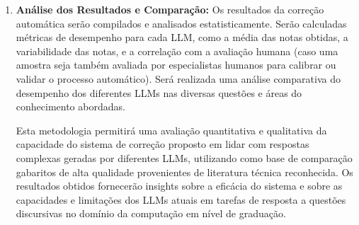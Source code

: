 \begin{enumerate}
\begin{itemize}
        \item \textbf{Coerência e Clareza:} Avaliação da organização lógica, fluidez textual e inteligibilidade da resposta gerada.

        \item \textbf{Similaridade Semântica:} Utilização de métricas de similaridade de texto (como cosseno de embeddings ou outras métricas específicas para avaliação de texto gerado por IA) para quantificar o quão próxima a resposta do LLM está do gabarito em termos de significado.
    \end{itemize}

    O sistema de correção automática, conforme descrito nas seções anteriores deste capítulo , atribuirá uma nota ou um conjunto de pontuações para cada resposta de cada LLM. 

    \item \textbf{Análise dos Resultados e Comparação:} Os resultados da correção automática serão compilados e analisados estatisticamente. Serão calculadas métricas de desempenho para cada LLM, como a média das notas obtidas, a variabilidade das notas, e a correlação com a avaliação humana (caso uma amostra seja também avaliada por especialistas humanos para calibrar ou validar o processo automático). Será realizada uma análise comparativa do desempenho dos diferentes LLMs nas diversas questões e áreas do conhecimento abordadas.

    Esta metodologia permitirá uma avaliação quantitativa e qualitativa da capacidade do sistema de correção proposto em lidar com respostas complexas geradas por diferentes LLMs, utilizando como base de comparação gabaritos de alta qualidade provenientes de literatura técnica reconhecida. Os resultados obtidos fornecerão insights sobre a eficácia do sistema e sobre as capacidades e limitações dos LLMs atuais em tarefas de resposta a questões discursivas no domínio da computação em nível de graduação.
\end{enumerate}